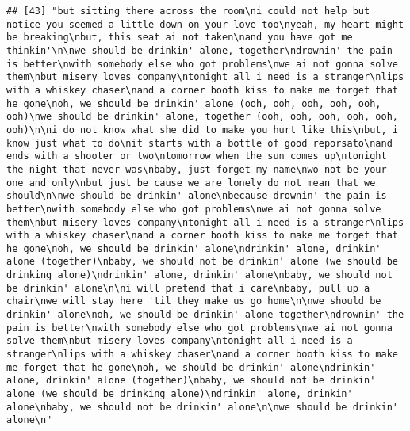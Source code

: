 \documentclass[]{article}
\begin{document}
\begin{verbatim}
## [43] "but sitting there across the room\ni could not help but notice you seemed a little down on your love too\nyeah, my heart might be breaking\nbut, this seat ai not taken\nand you have got me thinkin'\n\nwe should be drinkin' alone, together\ndrownin' the pain is better\nwith somebody else who got problems\nwe ai not gonna solve them\nbut misery loves company\ntonight all i need is a stranger\nlips with a whiskey chaser\nand a corner booth kiss to make me forget that he gone\noh, we should be drinkin' alone (ooh, ooh, ooh, ooh, ooh, ooh)\nwe should be drinkin' alone, together (ooh, ooh, ooh, ooh, ooh, ooh)\n\ni do not know what she did to make you hurt like this\nbut, i know just what to do\nit starts with a bottle of good reporsato\nand ends with a shooter or two\ntomorrow when the sun comes up\ntonight the night that never was\nbaby, just forget my name\nwo not be your one and only\nbut just be cause we are lonely do not mean that we should\n\nwe should be drinkin' alone\nbecause drownin' the pain is better\nwith somebody else who got problems\nwe ai not gonna solve them\nbut misery loves company\ntonight all i need is a stranger\nlips with a whiskey chaser\nand a corner booth kiss to make me forget that he gone\noh, we should be drinkin' alone\ndrinkin' alone, drinkin' alone (together)\nbaby, we should not be drinkin' alone (we should be drinking alone)\ndrinkin' alone, drinkin' alone\nbaby, we should not be drinkin' alone\n\ni will pretend that i care\nbaby, pull up a chair\nwe will stay here 'til they make us go home\n\nwe should be drinkin' alone\noh, we should be drinkin' alone together\ndrownin' the pain is better\nwith somebody else who got problems\nwe ai not gonna solve them\nbut misery loves company\ntonight all i need is a stranger\nlips with a whiskey chaser\nand a corner booth kiss to make me forget that he gone\noh, we should be drinkin' alone\ndrinkin' alone, drinkin' alone (together)\nbaby, we should not be drinkin' alone (we should be drinking alone)\ndrinkin' alone, drinkin' alone\nbaby, we should not be drinkin' alone\n\nwe should be drinkin' alone\n"                                                                                                                                                                                                                                                                                                                                                                                                                                                                                                                                                                                                                                                                                                                                                                                         

\end{verbatim}
\end{document}

